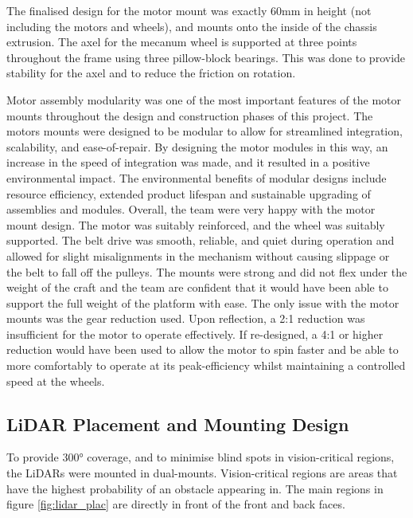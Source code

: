 \documentclass [12pt]{article}
\begin{document}
The finalised design for the motor mount was exactly 60mm in height (not including the motors and wheels), and mounts onto the inside of the chassis extrusion. The axel for the mecanum wheel is supported at three points throughout the frame using three pillow-block bearings. This was done to provide stability for the axel and to reduce the friction on rotation.


Motor assembly modularity was one of the most important features of the motor mounts throughout the design and construction phases of this project. The motors mounts were designed to be modular to allow for streamlined integration, scalability, and ease-of-repair. By designing the motor modules in this way, an increase in the speed of integration was made, and it resulted in a positive environmental impact. The environmental benefits of modular designs include resource efficiency, extended product lifespan and sustainable upgrading of assemblies and modules.
Overall, the team were very happy with the motor mount design. The motor was suitably reinforced, and the wheel was suitably supported. The belt drive was smooth, reliable, and quiet during operation and allowed for slight misalignments in the mechanism without causing slippage or the belt to fall off the pulleys. The mounts were strong and did not flex under the weight of the craft and the team are confident that it would have been able to support the full weight of the platform with ease. The only issue with the motor mounts was the gear reduction used. Upon reflection, a 2:1 reduction was insufficient for the motor to operate effectively. If re-designed, a 4:1 or higher reduction would have been used to allow the motor to spin faster and be able to more comfortably to operate at its peak-efficiency whilst maintaining a controlled speed at the wheels.

\subsection{LiDAR Placement and Mounting Design}
To provide 300° coverage, and to minimise blind spots in vision-critical regions, the LiDARs were mounted in dual-mounts. Vision-critical regions are areas that have the highest probability of an obstacle appearing in. The main regions in figure \ref{fig:lidar_plac} are directly in front of the front and back faces.
\end{document}
